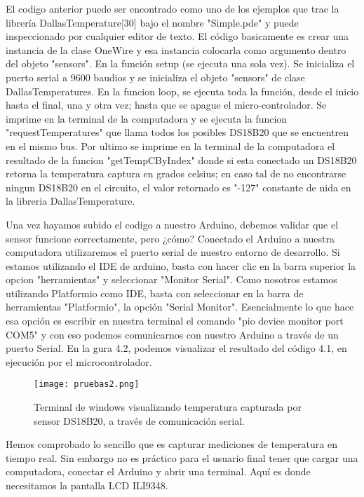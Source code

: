\par \noindent
El codigo anterior puede ser encontrado como uno de los ejemplos que trae la librería DallasTemperature[30] bajo el nombre "Simple.pde" y puede inspeccionado por cualquier editor de texto. El código basicamente es crear una instancia de la clase OneWire y esa instancia colocarla como argumento dentro del objeto "sensors". En la función setup (se ejecuta una sola vez). Se inicializa el puerto serial a 9600 baudios y se inicializa el objeto "sensors" de clase DallasTemperatures. En la funcion loop, se ejecuta toda la función, desde el inicio hasta el  final, una y otra vez; hasta que se apague el micro-controlador. Se imprime en la terminal de la computadora y se ejecuta la funcion "requestTemperatures" que llama todos los posibles DS18B20 que se encuentren en el mismo bus. Por ultimo se imprime en la terminal de la computadora el resultado de la funcion "getTempCByIndex" donde si esta conectado un DS18B20 retorna la temperatura captura en grados celsius; en caso tal de no encontrarse ningun DS18B20 en el circuito, el valor retornado es "-127" constante de nida en la libreria DallasTemperature.

\par \noindent
Una vez hayamos subido el codigo a nuestro Arduino, debemos validar que el sensor funcione correctamente, pero ¿cómo? Conectado el Arduino a nuestra computadora utilizaremos el puerto serial de nuestro entorno de desarrollo. Si estamos utilizando el IDE de arduino, basta con hacer clic en la barra superior la opcion "herramientas" y seleccionar "Monitor Serial". Como nosotros estamos utilizando Platformio como IDE, basta con seleccionar en la barra de herramientas "Platformio", la opción "Serial Monitor". Esencialmente lo que hace esa opción es escribir en nuestra terminal el comando "pio device monitor  port COM5" y con eso podemos comunicarnos con nuestro Arduino a través de un puerto Serial. En la  gura 4.2, podemos visualizar el resultado del código 4.1, en ejecución por el microcontrolador.

\begin{figure}[H]
	\centering
	\texttt{[image: pruebas2.png]}
	\caption{Terminal de windows visualizando temperatura capturada por sensor DS18B20, a través de comunicación serial.}
\end{figure}

\par \noindent
Hemos comprobado lo sencillo que es capturar mediciones de temperatura en tiempo real. Sin embargo no es práctico para el usuario final tener que cargar una computadora, conectar el Arduino y abrir una terminal. Aquí es donde necesitamos la pantalla LCD ILI9348.

